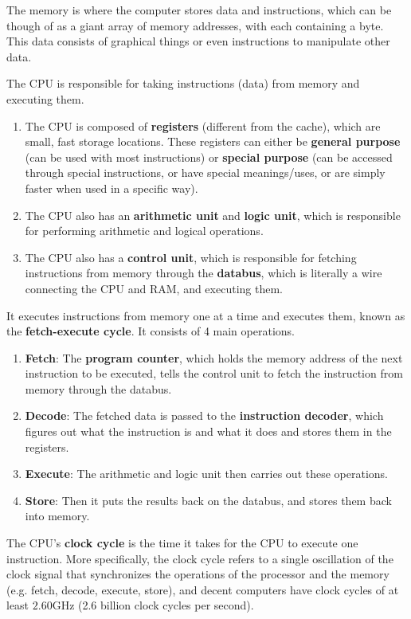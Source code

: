 \documentclass{article}
\begin{document}
    \begin{definition}[Memory]
      The memory is where the computer stores data and instructions, which can be though of as a giant array of memory addresses, with each containing a byte. This data consists of graphical things or even instructions to manipulate other data.
    \end{definition}

    \begin{definition}
      The CPU is responsible for taking instructions (data) from memory and executing them. 
      \begin{enumerate} 
        \item The CPU is composed of \textbf{registers} (different from the cache), which are small, fast storage locations. These registers can either be \textbf{general purpose} (can be used with most instructions) or \textbf{special purpose} (can be accessed through special instructions, or have special meanings/uses, or are simply faster when used in a specific way).
        \item The CPU also has an \textbf{arithmetic unit} and \textbf{logic unit}, which is responsible for performing arithmetic and logical operations. 
        \item The CPU also has a \textbf{control unit}, which is responsible for fetching instructions from memory through the \textbf{databus}, which is literally a wire connecting the CPU and RAM, and executing them. 
      \end{enumerate}
      It executes instructions from memory one at a time and executes them, known as the \textbf{fetch-execute cycle}. It consists of 4 main operations. 
      \begin{enumerate} 
        \item \textbf{Fetch}: The \textbf{program counter}, which holds the memory address of the next instruction to be executed, tells the control unit to fetch the instruction from memory through the databus. 
        \item \textbf{Decode}: The fetched data is passed to the \textbf{instruction decoder}, which figures out what the instruction is and what it does and stores them in the registers.
        \item \textbf{Execute}: The arithmetic and logic unit then carries out these operations. 
        \item \textbf{Store}: Then it puts the results back on the databus, and stores them back into memory.
      \end{enumerate} 
      The CPU's \textbf{clock cycle} is the time it takes for the CPU to execute one instruction. More specifically, the clock cycle refers to a single oscillation of the clock signal that synchronizes the operations of the processor and the memory (e.g. fetch, decode, execute, store), and decent computers have clock cycles of at least $2.60$GHz (2.6 billion clock cycles per second). 
    \end{definition}
\end{document}
